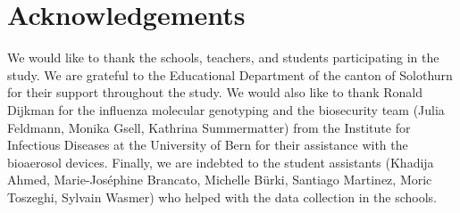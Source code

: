 \documentclass[fleqn,11pt]{wlscirep}
\begin{document}
\section*{Acknowledgements}
We would like to thank the schools, teachers, and students participating in the study. We are grateful to the Educational Department of the canton of Solothurn for their support throughout the study. We would also like to thank Ronald Dijkman for the influenza molecular genotyping and the biosecurity team (Julia Feldmann, Monika Gsell, Kathrina Summermatter) from the Institute for Infectious Diseases at the University of Bern for their assistance with the bioaerosol devices. Finally, we are indebted to the student assistants (Khadija Ahmed, Marie-Joséphine Brancato, Michelle Bürki, Santiago Martinez, Moric Toszeghi, Sylvain Wasmer) who helped with the data collection in the schools.


\end{document}
